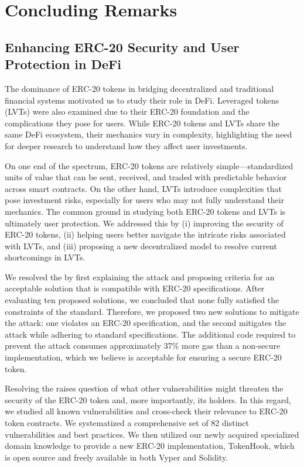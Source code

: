 
\chapter{Concluding Remarks}\label{ch:remarks}

\section{Enhancing ERC-20 Security and User Protection in DeFi}
The dominance of ERC-20 tokens in bridging decentralized and traditional financial systems motivated us to study their role in DeFi. Leveraged tokens (LVTs) were also examined due to their ERC-20 foundation and the complications they pose for users. While ERC-20 tokens and LVTs share the same DeFi ecosystem, their mechanics vary in complexity, highlighting the need for deeper research to understand how they affect user investments.

On one end of the spectrum, ERC-20 tokens are relatively simple—standardized units of value that can be sent, received, and traded with predictable behavior across smart contracts. On the other hand, LVTs introduce complexities that pose investment risks, especially for users who may not fully understand their mechanics. The common ground in studying both ERC-20 tokens and LVTs is ultimately user protection. We addressed this by (i) improving the security of ERC-20 tokens, (ii) helping users better navigate the intricate risks associated with LVTs, and (iii) proposing a new decentralized model to resolve current shortcomings in LVTs.

We resolved the \mwa by first explaining the attack and proposing criteria for an acceptable solution that is compatible with ERC-20 specifications. After evaluating ten proposed solutions, we concluded that none fully satisfied the constraints of the standard. Therefore, we proposed two new solutions to mitigate the attack: one violates an ERC-20 specification, and the second mitigates the attack while adhering to standard specifications. The additional code required to prevent the attack consumes approximately 37\% more gas than a non-secure implementation, which we believe is acceptable for ensuring a secure ERC-20 token.

Resolving the \mwa raises question of what other vulnerabilities might threaten the security of the ERC-20 token and, more importantly, its holders. In this regard, we studied all known vulnerabilities and cross-check their relevance to ERC-20 token contracts. We systematized a comprehensive set of 82 distinct vulnerabilities and best practices. We then utilized our newly acquired specialized domain knowledge to provide a new ERC-20 implementation, TokenHook, which is open source and freely available in both Vyper and Solidity.

